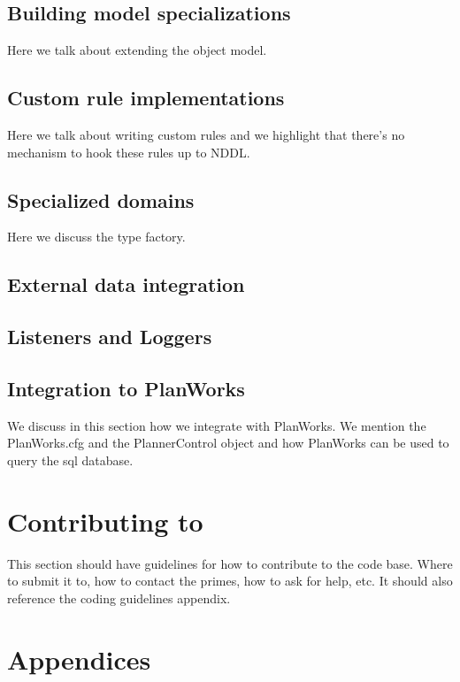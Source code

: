 \documentclass[10pt, letterpaper, twoside]{article}
\begin{document}
\subsection{Building model specializations}

Here we talk about extending the object model.

\subsection{Custom rule implementations}

Here we talk about writing custom rules and we highlight that there's no
mechanism to hook these rules up to NDDL.

\subsection{Specialized domains}

Here we discuss the type factory.

\subsection{External data integration}


\subsection{Listeners and Loggers}
\subsection{Integration to PlanWorks}

We discuss in this section how we integrate with PlanWorks.  We mention the
PlanWorks.cfg and the PlannerControl object and how PlanWorks can be used
to query the sql database.

\section{Contributing to \ET}

This section should have guidelines for how to contribute to the code
base.  Where to submit it to, how to contact the primes, how to ask for
help, etc.  It should also reference the coding guidelines appendix.




\section{Appendices}
\end{document}
